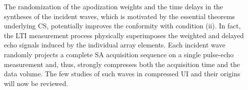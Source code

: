 The randomization of
the apodization weights and
the time delays in
the syntheses of
the incident waves, which is motivated by
the essential theorems underlying
\ac{CS}, potentially improves
the conformity with
condition (ii).
In fact,
the \ac{LTI} measurement process physically superimposes
the weighted and
delayed echo signals induced by
the individual array elements.
Each incident wave randomly projects
a complete \ac{SA} acquisition sequence on
a single pulse-echo measurement and, thus, strongly compresses both
the acquisition time and
the data volume.
The few studies of
such waves in
compressed \ac{UI} and
their origins will now be reviewed.

